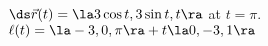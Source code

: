 {$\ds \vec r(t) = \la 3\cos t,3\sin t,t\ra$ at $t=\pi$.
}
{
$\ell(t) = \la -3,0,\pi\ra + t\la0,-3,1\ra$
}


